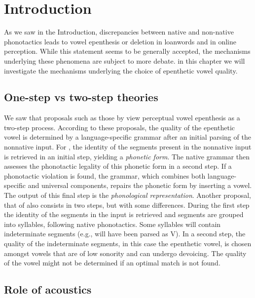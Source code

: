 

{\color{red}
\section{Introduction}
As we saw in the Introduction, discrepancies between native and non-native phonotactics leads to vowel epenthesis or deletion in loanwords and in online perception.
While this statement seems to be generally accepted, the mechanisms underlying these phenomena are subject to more debate. in this chapter we will investigate the mechanisms underlying the choice of epenthetic vowel quality. 


\subsection{One-step vs two-step theories}
We saw that proposals such as those by \cite{berent2007, monahan2009} view perceptual vowel epenthesis as a two-step process.
According to these proposals, the quality of the epenthetic vowel is determined by a language-specific grammar after an initial parsing of the nonnative input.
For \cite{berent2007}, the identity of the segments present in the nonnative input is retrieved in an initial step, yielding a \textit{phonetic form}. The native grammar then assesses the phonotactic legality of this phonetic form in a second step. If a phonotactic violation is found, the grammar, which combines both language-specific and universal components, repairs the phonetic form by inserting a vowel. The output of this final step is the \textit{phonological representation}.
Another proposal, that of \cite{monahan2009} also consists in two steps, but with some differences. During the first step the identity of the segments in the input is retrieved and segments are grouped into syllables, following native phonotactics. Some syllables will contain indeterminate segments (e.g.,  will have been parsed as V). In a second step, the quality of the indeterminate segments, in this case the epenthetic vowel, is chosen amongst vowels that are of low sonority and can undergo devoicing. The quality of the vowel might not be determined if an optimal match is not found.   

\subsection{Role of acoustics}

}

